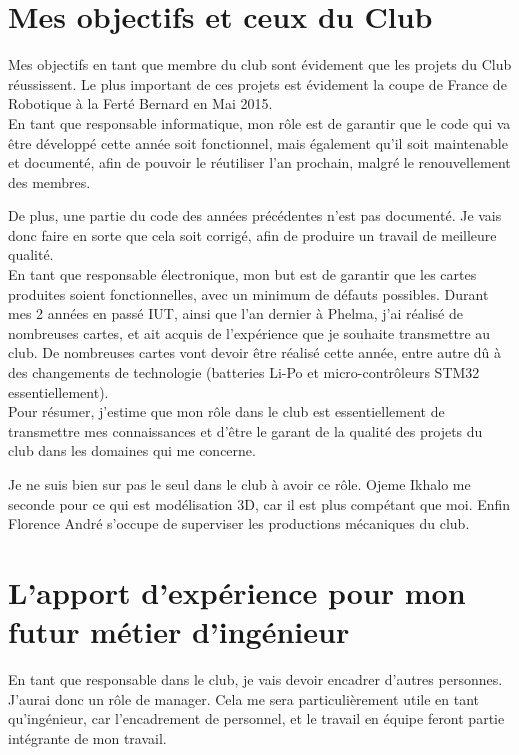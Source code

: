 \documentclass[a4paper,11pt]{article} \usepackage[T1]{fontenc} \usepackage[utf8]{inputenc} \usepackage[francais]{babel}
\begin{document}
\part{Mes objectifs et ceux du Club}

Mes objectifs en tant que membre du club sont évidement que les projets du Club réussissent. Le plus important de ces projets est évidement la coupe de France de Robotique à la Ferté Bernard en Mai 2015.\\

En tant que responsable informatique, mon rôle est de garantir que le code qui va être développé cette année soit fonctionnel, mais également qu'il soit maintenable et documenté, afin de pouvoir le réutiliser l'an prochain, malgré le renouvellement des membres.

De plus, une partie du code des années précédentes n'est pas documenté. Je vais donc faire en sorte que cela soit corrigé, afin de produire un travail de meilleure qualité.\\

En tant que responsable électronique, mon but est de garantir que les cartes produites soient fonctionnelles, avec un minimum de défauts possibles. Durant mes 2 années en passé IUT, ainsi que l'an dernier à Phelma, j'ai réalisé de nombreuses cartes, et ait acquis de l'expérience que je souhaite transmettre au club. De nombreuses cartes vont devoir être réalisé cette année, entre autre dû à des changements de technologie (batteries Li-Po et micro-contrôleurs STM32 essentiellement).\\

Pour résumer, j'estime que mon rôle dans le club est essentiellement de transmettre mes connaissances et d'être le garant de la qualité des projets du club dans les domaines qui me concerne.

Je ne suis bien sur pas le seul dans le club à avoir ce rôle. Ojeme Ikhalo me seconde pour ce qui est modélisation 3D, car il est plus compétant que moi. Enfin Florence André s'occupe de superviser les productions mécaniques du club.

\part{L'apport d'expérience pour mon futur métier d'ingénieur}

En tant que responsable dans le club, je vais devoir encadrer d'autres personnes. J'aurai donc un rôle de manager. Cela me sera particulièrement utile en tant qu'ingénieur, car l'encadrement de personnel, et le travail en équipe feront partie intégrante de mon travail.
\end{document}
